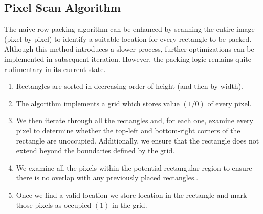 \documentclass[12pt, a4paper,openany]{article}
\begin{document}
\subsection{Pixel Scan Algorithm}
\begin{flushleft}
The naive row packing algorithm can be enhanced by scanning the entire image (pixel by pixel) to identify a suitable location for every rectangle to be packed. Although this method introduces a slower process, further optimizations can be implemented in subsequent iteration. However, the packing logic remains quite rudimentary in its current state.
\begin{enumerate}
    \item Rectangles are sorted in decreasing order of height (and then by width).
    \item The algorithm implements a grid which stores value \((1/0)\) of every pixel.
    \item We then iterate through all the rectangles and, for each one, examine every pixel to determine whether the top-left and bottom-right corners of the rectangle are unoccupied. Additionally, we ensure that the rectangle does not extend beyond the boundaries defined by the grid.
    \item  We examine all the pixels within the potential rectangular region to ensure there is no overlap with any previously placed rectangles..
    \item Once we find a valid location we store location in the rectangle and mark those pixels as occupied \((1)\) in the grid.
    \end{enumerate}
\end{flushleft}
\end{document}
